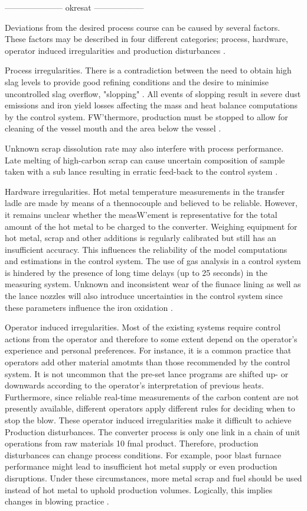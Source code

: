 --------------------- okresat ------------------

Deviations from the desired process course can be caused by several factors. These factors may be described in four different categories; process, hardware, operator induced irregularities and production disturbances \citep{Widlund1998}.

Process irregularities. There is a contradiction between the need to obtain high slag levels to provide good refining conditions and the desire to minimise uncontrolled slag overflow, "slopping" . All events of slopping result in severe dust emissions and iron yield losses affecting the mass and heat balance computations by the control system. FW'thermore, production must be stopped to allow for cleaning of the vessel mouth and the area below the vessel \citep{Widlund1998}.

Unknown scrap dissolution rate may also interfere with process performance. Late melting of high-carbon scrap can cause uncertain composition of sample taken with a sub lance resulting in erratic feed-back to the control system \citep{Widlund1998}.

Hardware irregularities. Hot metal temperature measurements in the transfer ladle are made by means of a thennocouple and believed to be reliable. However, it remains unclear whether the measW'ement is representative for the total amount of the hot metal to be charged to the converter. Weighing equipment for hot metal, scrap and other additions is regularly calibrated but still has an insufficient accuracy. This influences the reliability of the model computations and estimations in the control system. The use of gas analysis in a control system is hindered by the presence of long time delays (up to 25 seconds) in the measuring system. Unknown and inconsistent wear of the fiunace lining as well as the lance nozzles will also introduce uncertainties in the control system since these parameters influence the iron oxidation \citep{Widlund1998}.

Operator induced irregularities. Most of the existing systems require control actions from the operator and therefore to some extent depend on the operator's experience and personal preferences. For instance, it is a common practice that operators add other material amotmts than those recommended by the control system. It is not uncommon that the pre-set lance programs are shifted up- or downwards according to the operator's interpretation of previous heats. Furthermore, since reliable real-time measurements of the carbon content are not presently available, different operators apply different rules for deciding when to stop the blow. These operator induced irregularities make it difficult to achieve Production disturbances. The converter process is only one link in a chain of unit operations from raw materials 10 fmal product. Therefore, production disturbances can change process conditions. For example, poor blast furnace performance might lead to insufficient hot metal supply or even production disruptions. Under these circumstances, more metal scrap and fuel should be used instead of hot metal to uphold production volumes. Logically, this implies changes in blowing practice \citep{Widlund1998}.


